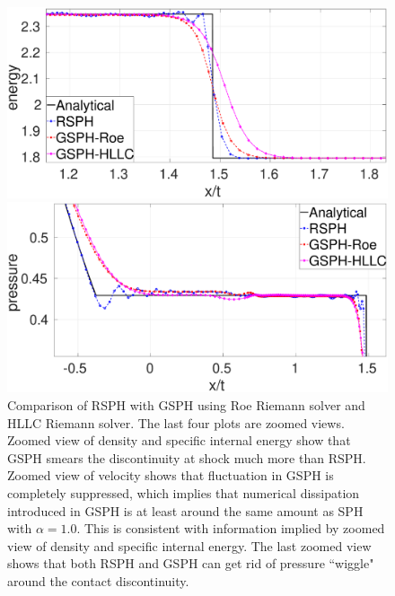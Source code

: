 \begin{figure}
\begin{minipage}{.495 \textwidth}
    \end{minipage}%
       \\
    \begin{minipage}{.495 \textwidth}
        \centering
        \includegraphics[width=0.99 \textwidth,height=0.6\textwidth]{./Chapter-4/Figures/Sod/RCM-Sod-GSPH-compare-e-zoom}
    \end{minipage}%
    \begin{minipage}{.495\textwidth}
        \centering
        \includegraphics[width=0.99 \textwidth,height=0.6\textwidth]{./Chapter-4/Figures/Sod/RCM-Sod-GSPH-compare-p-zoom}
    \end{minipage}%
    \caption{Comparison of RSPH with GSPH using Roe Riemann solver and HLLC Riemann solver. The last four plots are zoomed views. Zoomed view of density and specific internal energy show that GSPH smears the discontinuity at shock much more than RSPH. Zoomed view of velocity shows that fluctuation in GSPH is completely suppressed, which implies that numerical dissipation introduced in GSPH is at least around the same amount as SPH with $\alpha=1.0$. This is consistent with information implied by zoomed view of density and specific internal energy. The last zoomed view shows that both RSPH and GSPH can get rid of pressure ``wiggle" around the contact discontinuity.}
    \label{fig:RCM-Sod-GSPH}
\end{figure}

